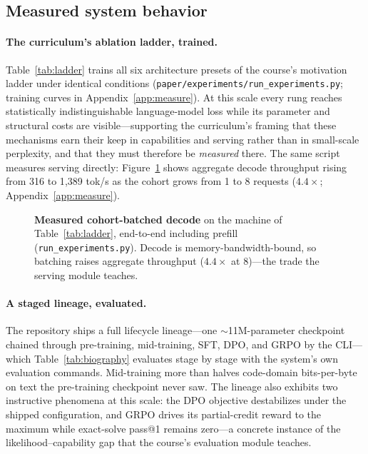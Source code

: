 

\subsection{Measured system behavior}
\label{sec:eval-measured}




\paragraph{The curriculum's ablation ladder, trained.}
Table~\ref{tab:ladder} trains all six architecture presets of the course's
motivation ladder under identical conditions
(\texttt{paper/experiments/run\_experiments.py}; training curves in
Appendix~\ref{app:measure}). At this scale every rung reaches statistically
indistinguishable language-model loss while its parameter and structural
costs are visible---supporting the curriculum's framing that these
mechanisms earn their keep in capabilities and serving rather than in
small-scale perplexity, and that they must therefore be \emph{measured}
there. The same script measures serving directly: Figure~\ref{fig:batching}
shows aggregate decode throughput rising from 316 to 1{,}389 tok/s as the
cohort grows from 1 to 8 requests ($4.4\times$; Appendix~\ref{app:measure}).

\begin{figure}[t]
  \centering
  
  \caption{\textbf{Measured cohort-batched decode} on the machine of
  Table~\ref{tab:ladder}, end-to-end including prefill
  (\texttt{run\_experiments.py}). Decode is memory-bandwidth-bound, so
  batching raises aggregate throughput ($4.4\times$ at 8)---the trade the
  serving module teaches.}
  \label{fig:batching}
\end{figure}

\paragraph{A staged lineage, evaluated.} The repository ships a full
lifecycle lineage---one $\sim$11M-parameter checkpoint chained through
pre-training, mid-training, SFT, DPO, and GRPO by the CLI---which
Table~\ref{tab:biography} evaluates stage by stage with the system's own
evaluation commands. Mid-training more than halves code-domain bits-per-byte
on text the pre-training checkpoint never saw. The lineage also exhibits two
instructive phenomena at this scale: the DPO objective destabilizes under the
shipped configuration, and GRPO drives its partial-credit reward to the
maximum while exact-solve pass@1 remains zero---a concrete instance of the
likelihood--capability gap that the course's evaluation module teaches.

